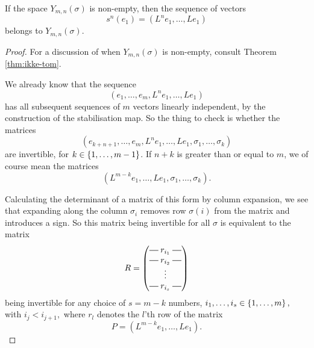 \begin{theorem}
  \label{thm:eksplicit-element}
  If the space $Y_{m,n}(\sigma)$ is non-empty, then the sequence of
  vectors
  \[ s^n(e_1) = \left(L^n e_1,\dots,Le_1\right) \]
  belongs to $Y_{m,n}(\sigma)$.
\end{theorem}
\begin{proof}
  For a discussion of when $Y_{m,n}(\sigma)$ is non-empty, consult
  Theorem \ref{thm:ikke-tom}.
  
  We already know that the sequence
  \[ \left(e_1,\dots,e_m,L^n e_1,\dots, Le_1 \right) \]
  has all subsequent sequences of $m$ vectors linearly independent,
  by the construction of the stabilisation map. So the thing to check
  is whether the matrices
  \[ \left(e_{k+n+1}, \dots, e_m,L^n e_1, \dots, Le_1, \sigma_1, \dots,
    \sigma_{k}\right) \]
  are invertible, for $k \in \left\{ 1,\dots,m-1 \right\}$. If $n+k$ is greater
  than or equal to $m$, we of course mean the matrices
  \[ \left( L^{m-k}e_1,\dots,L e_1,\sigma_1,\dots,\sigma_k \right). \]
  
  Calculating the determinant of a matrix of this form by column
  expansion, we see that expanding along the column $\sigma_i$ removes
  row $\sigma(i)$ from the matrix and introduces a sign. So this
  matrix being invertible for all $\sigma$ is equivalent to the matrix 
  \[ R = 
  \begin{pmatrix}
    \matrow{r_{i_1}} \\
    \matrow{r_{i_2}} \\
    & \hspace{-0.75em} \vdots & \\
    \matrow{r_{i_s}}
  \end{pmatrix}
  \]
  being invertible for any choice
  of $s=m-k$ numbers,
  $i_1,\dots,i_s \in \left\{ 1,\dots,m \right\},$ with $i_j < i_{j+1},$ 
  where $r_{l}$ denotes the $l$'th row of the
  matrix
  \[ P = (L^{m-k}e_1,\dots,Le_1). \]
  

\end{proof}
